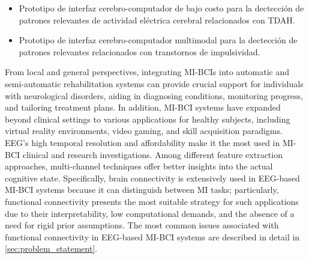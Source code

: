 \begin{itemize}
    \item Prototipo de interfaz cerebro-computador de bajo costo para la dectección de patrones relevantes de actividad eléctrica cerebral relacionados con TDAH.
    \item Prototipo de interfaz cerebro-computador multimodal para la dectección de patrones relevantes relacionados con transtornos de impulsividad.
\end{itemize}

From local and general perspectives, integrating MI-BCIs into automatic and semi-automatic rehabilitation systems can provide crucial support for individuals with neurological disorders, aiding in diagnosing conditions, monitoring progress, and tailoring treatment plans. In addition, MI-BCI systems have expanded beyond clinical settings to various applications for healthy subjects, including virtual reality environments, video gaming, and skill acquisition paradigms. EEG's high temporal resolution and affordability make it the most used in MI-BCI clinical and research investigations. Among different feature extraction approaches, multi-channel techniques offer better insights into the actual cognitive state. Specifically, brain connectivity is extensively used in EEG-based MI-BCI systems because it can distinguish between MI tasks; particularly, functional connectivity presents the most suitable strategy for such applications due to their interpretability, low computational demands, and the absence of a need for rigid prior assumptions. The most common issues associated with functional connectivity in EEG-based MI-BCI systems are described in detail in \cref{sec:problem_statement}.
